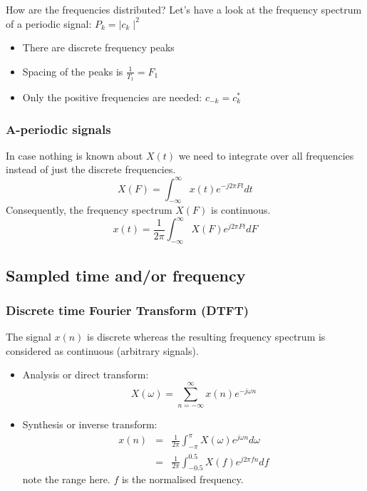 \documentclass[12pt,a4paper]{article}
\begin{document}
How are the frequencies distributed? Let's have a look at the
frequency spectrum of a periodic signal: $P_{k} = \mid c_{k} \mid^{2}$

\begin{itemize}
\item There are discrete frequency peaks
\item Spacing of the peaks is $\frac{1}{T_1} = F_1$
\item Only the positive frequencies are needed: $c_{-k} = c_{k}^{*}$
\end{itemize}



\subsubsection{A-periodic signals}
In case nothing is known about $X(t)$ we need to integrate
over all frequencies instead of just the discrete frequencies.
\begin{equation} 
X(F) = \int_{-\infty}^{\infty} x(t) e^{-j 2 \pi F t} dt
\end{equation}
Consequently, the frequency spectrum $X(F)$ is continuous.
\begin{equation} 
x(t) = \frac{1}{2\pi} \int_{-\infty}^{\infty} X(F) e^{j 2 \pi F t} dF
\end{equation}






\subsection{Sampled time and/or frequency}

\subsubsection{Discrete time Fourier Transform (DTFT)}

The signal $x(n)$ is discrete whereas the resulting frequency
spectrum is considered as continuous (arbitrary signals).

\begin{itemize}
\item Analysis or direct transform:
\begin{equation}
X(\omega)=\sum_{n=-\infty}^{\infty} x(n) e^{-j\omega n}
\end{equation}

\item Synthesis or inverse transform:
\begin{eqnarray}
x(n) & = & \frac{1}{2\pi} \int_{-\pi}^{\pi} X(\omega) e^{j\omega n} d\omega \\
     & = & \frac{1}{2\pi} \int_{-0.5}^{0.5} X(f) e^{j 2\pi f n} df
\end{eqnarray}
note the range here. $f$ is the normalised frequency.

\end{itemize}
\end{document}
